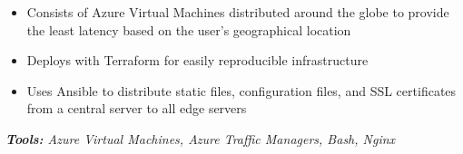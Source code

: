 \documentclass[10pt,letter]{altacv}
\begin{document}

\divider

\begin{itemize}
\item Consists of Azure Virtual Machines distributed around the globe to provide the least latency based on the user's geographical location
\item Deploys with Terraform for easily reproducible infrastructure
\item Uses Ansible to distribute static files, configuration files, and SSL certificates from a central server to all edge servers
\end{itemize}
\textit{\textbf{Tools:} Azure Virtual Machines, Azure Traffic Managers, Bash, Nginx}

\clearpage
\end{document}
